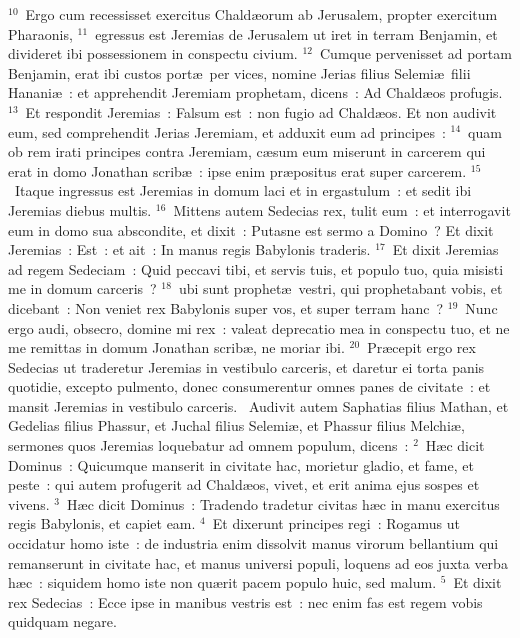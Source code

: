 ${}^{10}$~Ergo cum recessisset exercitus Chald\ae orum ab Jerusalem, propter exercitum Pharaonis,
${}^{11}$~egressus est Jeremias de Jerusalem ut iret in terram Benjamin, et divideret ibi possessionem in conspectu civium.
${}^{12}$~Cumque pervenisset ad portam Benjamin, erat ibi custos port\ae\ per vices, nomine Jerias filius Selemi\ae\ filii Hanani\ae~: et apprehendit Jeremiam prophetam, dicens~: Ad Chald\ae os profugis.
${}^{13}$~Et respondit Jeremias~: Falsum est~: non fugio ad Chald\ae os. Et non audivit eum, sed comprehendit Jerias Jeremiam, et adduxit eum ad principes~:
${}^{14}$~quam ob rem irati principes contra Jeremiam, c\ae sum eum miserunt in carcerem qui erat in domo Jonathan scrib\ae~: ipse enim pr\ae positus erat super carcerem.
${}^{15}$~Itaque ingressus est Jeremias in domum laci et in ergastulum~: et sedit ibi Jeremias diebus multis.
${}^{16}$~Mittens autem Sedecias rex, tulit eum~: et interrogavit eum in domo sua abscondite, et dixit~: Putasne est sermo a Domino~? Et dixit Jeremias~: Est~: et ait~: In manus regis Babylonis traderis.
${}^{17}$~Et dixit Jeremias ad regem Sedeciam~: Quid peccavi tibi, et servis tuis, et populo tuo, quia misisti me in domum carceris~?
${}^{18}$~ubi sunt prophet\ae\ vestri, qui prophetabant vobis, et dicebant~: Non veniet rex Babylonis super vos, et super terram hanc~?
${}^{19}$~Nunc ergo audi, obsecro, domine mi rex~: valeat deprecatio mea in conspectu tuo, et ne me remittas in domum Jonathan scrib\ae , ne moriar ibi.
${}^{20}$~Pr\ae cepit ergo rex Sedecias ut traderetur Jeremias in vestibulo carceris, et daretur ei torta panis quotidie, excepto pulmento, donec consumerentur omnes panes de civitate~: et mansit Jeremias in vestibulo carceris.
~Audivit autem Saphatias filius Mathan, et Gedelias filius Phassur, et Juchal filius Selemi\ae , et Phassur filius Melchi\ae , sermones quos Jeremias loquebatur ad omnem populum, dicens~:
${}^{2}$~H\ae c dicit Dominus~: Quicumque manserit in civitate hac, morietur gladio, et fame, et peste~: qui autem profugerit ad Chald\ae os, vivet, et erit anima ejus sospes et vivens.
${}^{3}$~H\ae c dicit Dominus~: Tradendo tradetur civitas h\ae c in manu exercitus regis Babylonis, et capiet eam.
${}^{4}$~Et dixerunt principes regi~: Rogamus ut occidatur homo iste~: de industria enim dissolvit manus virorum bellantium qui remanserunt in civitate hac, et manus universi populi, loquens ad eos juxta verba h\ae c~: siquidem homo iste non qu\ae rit pacem populo huic, sed malum.
${}^{5}$~Et dixit rex Sedecias~: Ecce ipse in manibus vestris est~: nec enim fas est regem vobis quidquam negare.
